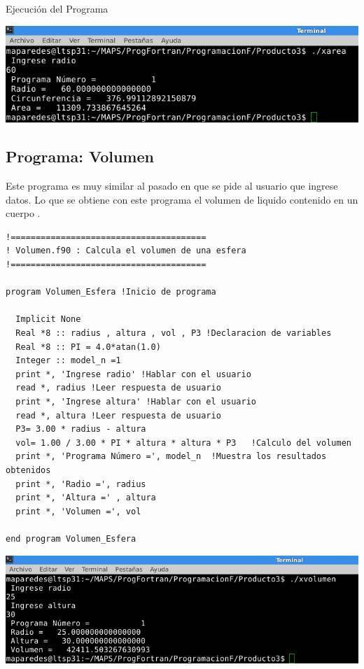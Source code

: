 \documentclass[12pt]{article}
\begin{document}
Ejecución del Programa
\begin{center}
\includegraphics[width=15cm]{Area}
\end{center}

\pagebreak

\subsection{Programa: Volumen}
Este programa es muy similar al pasado en que se pide al usuario que ingrese datos. Lo que se obtiene  con este programa el volumen de liquido contenido en un cuerpo .

\begin{verbatim}
!=======================================
! Volumen.f90 : Calcula el volumen de una esfera
!=======================================

program Volumen_Esfera !Inicio de programa

  Implicit None
  Real *8 :: radius , altura , vol , P3 !Declaracion de variables
  Real *8 :: PI = 4.0*atan(1.0)
  Integer :: model_n =1
  print *, 'Ingrese radio' !Hablar con el usuario
  read *, radius !Leer respuesta de usuario
  print *, 'Ingrese altura' !Hablar con el usuario
  read *, altura !Leer respuesta de usuario
  P3= 3.00 * radius - altura
  vol= 1.00 / 3.00 * PI * altura * altura * P3   !Calculo del volumen
  print *, 'Programa Número =', model_n  !Muestra los resultados obtenidos
  print *, 'Radio =', radius
  print *, 'Altura =' , altura
  print *, 'Volumen =', vol

end program Volumen_Esfera
\end{verbatim}

\begin{center}
\includegraphics[width=15cm]{Volumen}
\end{center}
\pagebreak
\end{document}
